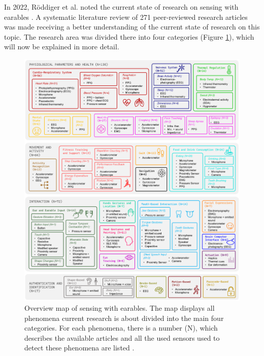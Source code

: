 In 2022, Röddiger et al. noted the current state of research on sensing with earables \cite{roddigerSensingEarablesSystematic2022a}.
A systematic literature review of 271 peer-reviewed research articles was made receiving a better understanding of the current state of research on this topic.
The research area was divided there into four categories (Figure \ref{fig:sensing_with_earables_overview}), which will now be explained in more detail.

\begin{figure}[t!]
    \centering
    \includegraphics[scale=0.3525]{thesis-doc/images/sensing_with_earables_overview.png}
    \caption{Overview map of sensing with earables. The map displays all phenomena current research is about divided into the main four categories. For each phenomena, there is a number (N), which describes the available articles and all the used sensors used to detect these phenomena are listed \cite{roddigerSensingEarablesSystematic2022a}.}
    \label{fig:sensing_with_earables_overview}
\end{figure}

